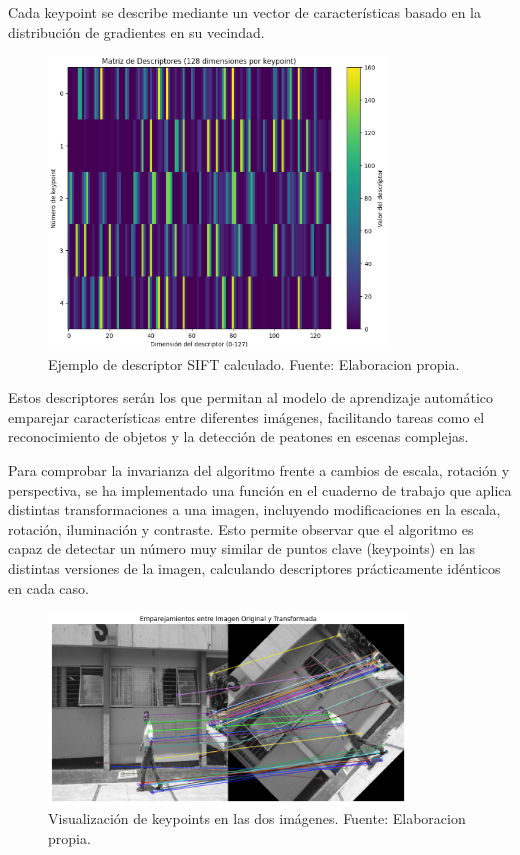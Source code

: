 \documentclass[a4paper]{article}
\begin{document}
Cada keypoint se describe mediante un vector de características basado en la distribución de gradientes en su vecindad.

\begin{figure}[H]
    \centering
    \includegraphics[width=0.8\textwidth]{images/sift_paso_8.png}
    \caption{Ejemplo de descriptor SIFT calculado. Fuente: Elaboracion propia.}
\end{figure}

Estos descriptores serán los que permitan al modelo de aprendizaje automático emparejar características entre diferentes imágenes, facilitando tareas como el reconocimiento de objetos y la detección de peatones en escenas complejas.

Para comprobar la invarianza del algoritmo frente a cambios de escala, rotación y perspectiva, se ha implementado una función en el cuaderno de trabajo que aplica distintas transformaciones a una imagen, incluyendo modificaciones en la escala, rotación, iluminación y contraste. Esto permite observar que el algoritmo es capaz de detectar un número muy similar de puntos clave (keypoints) en las distintas versiones de la imagen, calculando descriptores prácticamente idénticos en cada caso.

\begin{figure}[H]
    \centering
    \includegraphics[width=0.85\textwidth]{images/sift_inv.png}
    \caption{Visualización de keypoints en las dos imágenes. Fuente: Elaboracion propia.}
\end{figure}
\end{document}
